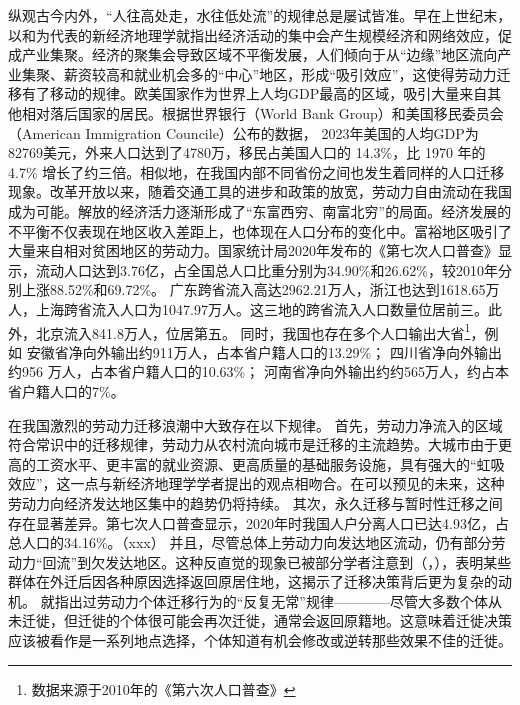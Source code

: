 \documentclass[a4paper,12pt,oneside, fontset=mac]{ctexbook} %
\begin{document}
纵观古今内外，“人往高处走，水往低处流”的规律总是屡试皆准。早在上世纪末，以\cite{krugmanIncreasingReturnsEconomic1991}和\cite{fujitaSpatialEconomyCities1999}为代表的新经济地理学就指出经济活动的集中会产生规模经济和网络效应，促成产业集聚。经济的聚集会导致区域不平衡发展，人们倾向于从“边缘”地区流向产业集聚、薪资较高和就业机会多的“中心”地区，形成“吸引效应”，这使得劳动力迁移有了移动的规律。欧美国家作为世界上人均GDP最高的区域，吸引大量来自其他相对落后国家的居民。根据世界银行（World Bank Group）和美国移民委员会（American Immigration Councile）公布的数据，
2023年美国的人均GDP为82769美元，外来人口达到了4780万，移民占美国人口的 14.3\%，比 1970 年的 4.7\% 增长了约三倍。相似地，在我国内部不同省份之间也发生着同样的人口迁移现象。改革开放以来，随着交通工具的进步和政策的放宽，劳动力自由流动在我国成为可能。解放的经济活力逐渐形成了“东富西穷、南富北穷”的局面。经济发展的不平衡不仅表现在地区收入差距上，也体现在人口分布的变化中。富裕地区吸引了大量来自相对贫困地区的劳动力。国家统计局2020年发布的《第七次人口普查》显示，流动人口达到3.76亿，占全国总人口比重分别为34.90\%和26.62\%，较2010年分别上涨88.52\%和69.72\%。
广东跨省流入高达2962.21万人，浙江也达到1618.65万人，上海跨省流入人口为1047.97万人。这三地的跨省流入人口数量位居前三。此外，北京流入841.8万人，位居第五。
同时，我国也存在多个人口输出大省\footnote{数据来源于2010年的《第六次人口普查》}，例如
安徽省净向外输出约911万人，占本省户籍人口的13.29\%；
四川省净向外输出约956 万人，占本省户籍人口的10.63\%；
河南省净向外输出约约565万人，约占本省户籍人口的7\%。

在我国激烈的劳动力迁移浪潮中大致存在以下规律。
首先，劳动力净流入的区域符合常识中的迁移规律，劳动力从农村流向城市是迁移的主流趋势。大城市由于更高的工资水平、更丰富的就业资源、更高质量的基础服务设施，具有强大的“虹吸效应”，这一点与新经济地理学学者提出的观点相吻合。在可以预见的未来，这种劳动力向经济发达地区集中的趋势仍将持续。
其次，永久迁移与暂时性迁移之间存在显著差异。第七次人口普查显示，2020年时我国人户分离人口已达4.93亿，占总人口的34.16\%。（xxx）
并且，尽管总体上劳动力向发达地区流动，仍有部分劳动力“回流”到欠发达地区。这种反直觉的现象已被部分学者注意到（\cite{ShiZhiLeiJiaTingBingFuJiaTingJueCeYuNongCunQianYiLaoDongLiHuiLiu2012}，\cite{RenYuanNongCunWaiChuLaoDongLiHuiLiuQianYiDeYingXiangYinSuHeHuiLiuXiaoYing2017}），表明某些群体在外迁后因各种原因选择返回原居住地，这揭示了迁移决策背后更为复杂的动机。
\cite{davanzoRepeatMigrationUnited1983}就指出过劳动力个体迁移行为的“反复无常”规律————尽管大多数个体从未迁徙，但迁徙的个体很可能会再次迁徙，通常会返回原籍地。这意味着迁徙决策应该被看作是一系列地点选择，个体知道有机会修改或逆转那些效果不佳的迁徙。
\end{document}

